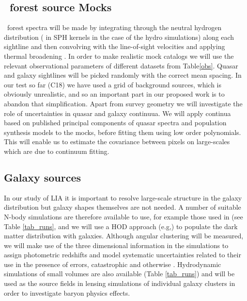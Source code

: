 \subsection{\lya\ forest source Mocks}
\lya\ forest spectra will be made by integrating through the
neutral hydrogen distribution ( in SPH kernels in the case of the hydro
simulations)
along each sightline and then convolving with the line-of-sight velocities
and applying thermal broadening \citep{hernquist1996}.
 In order to make realistic
mock catalogs we will use the relevant observational parameters
of different datasets from Table\ref{obs}. Quasar and galaxy sightlines will
be picked randomly with the correct mean spacing. In our test so far
(C18) we have used a grid of background sources, which is obviously
unrealistic, and so an important part in our proposed work is to abandon
that simplification. Apart from survey geometry we will investigate
the role of uncertainties in  quasar and galaxy continuua. We will 
apply continua based on published principal components
of quasar spectra \citep{leedr9} and population synthesis models
to the mocks, before fitting them using low order polynomials. This will
enable us to estimate the covariance between pixels on large-scales which
are due to continuum fitting.


\subsection{Galaxy sources}
\label{galaxysourcesims}
In our study of LIA it is important to resolve large-scale structure
in the galaxy distribution but galaxy shapes themselves are not needed.
A number of suitable N-body simulations are therefore 
available to use, for example
those used in \cite{zhu2017} (see Table \ref{tab_runs}, and we will use a HOD 
approach (e.g,) to populate the dark matter distribution with galaxies.
Although angular clustering will be measured, we will make use of the 
three dimensional information in the simulations to assign photometric
redshifts and model systematic uncertainties related to their use in 
the presence of errors, catastrophic and otherwise \citep{hearin2010}.
Hydrodynamic simulations of small volumes are also available 
(Table \ref{tab_runs}) and
will be used as the source fields in lensing simulations of individual
galaxy clusters in order to investigate baryon physics effects.


